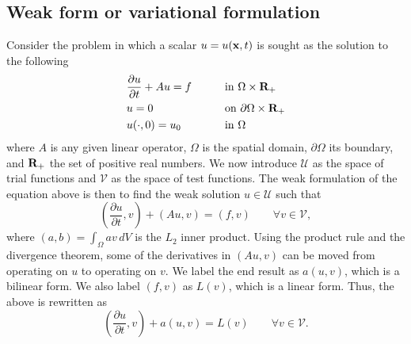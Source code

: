 \documentclass[oneside,a4paper,11pt]{report}
\begin{document}
\subsection{Weak form or variational formulation}
Consider the problem in which a scalar $u = u(\mathbf{x},t)$ is sought as the solution to the following
\begin{equation}
    \label{eq:fe_general_pde}
    \begin{aligned}
        &\frac{\partial u}{\partial t} + Au = f \qquad &&\text{in } \Omega \times \mathbf{R}_+ \\
        &u = 0 && \text{on } \partial \Omega \times \mathbf{R}_+ \\
        &u(\cdot,0) = u_0 && \text{in } \Omega 
    \end{aligned}
\end{equation}
where $A$ is any given linear operator, $\Omega$ is the spatial domain, $\partial \Omega$ its boundary, and $\mathbf{R}_+$ the set of positive real numbers. We now introduce $\mathcal{U}$ as the space of trial functions and $\mathcal{V}$ as the space of test functions. The weak formulation of the equation above is then to find the weak solution $u\in \mathcal{U}$ such that 
\begin{equation}
    \left ( \frac{\partial u}{\partial t} , v \right ) + (Au,v) = (f,v) \qquad \forall v \in \mathcal{V},
\end{equation}
where $(a,b)= \int_\Omega av \, dV$ is the $L_2$ inner product. Using the product rule and the divergence theorem, some of the derivatives in $(Au,v)$ can be moved from operating on $u$ to operating on $v$. We label the end result as $a(u,v)$, which is a bilinear form. We also label $(f,v)$ as $L(v)$, which is a linear form. Thus, the above is rewritten as 
\begin{equation}
\label{eq:weak_form}
    \left ( \frac{\partial u}{\partial t} , v \right ) + a(u,v) = L(v) \qquad \forall v \in \mathcal{V} .
\end{equation}
\end{document}
